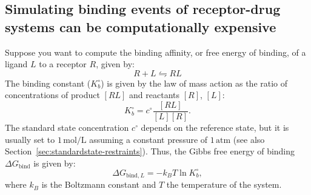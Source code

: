 \documentclass[9pt,bestpractices]{livecoms}
\begin{document}
\subsection{Simulating binding events of receptor-drug systems can be computationally expensive}
Suppose you want to compute the binding affinity, or free energy of binding, of a ligand $L$ to a receptor $R$, given by:
\begin{equation}
R+L \leftrightharpoons RL
\end{equation}
The binding constant ($K_b^{\circ}$) is given by the law of mass action as the ratio of concentrations of product $[RL]$ and reactants $[R]$, $[L]$:
\begin{equation}
 K_b^{\circ} = c^{\circ}\frac{[RL]}{[L][R]}.
\end{equation}
The standard state concentration $c^\circ$ depends on the reference state, but it is usually set to $1\,\mathrm{mol}/\mathrm{L}$ assuming a constant pressure of $1\,\mathrm{atm}$ (see also Section~\ref{sec:standardstate-restraints}).
Thus, the Gibbs free energy of binding $\Delta G_{\mathrm{bind}}$ is given by:
\begin{equation}
    \Delta G_{\mathrm{bind},L} = -k_BT\ln K_b^{\circ},
\end{equation}
where $k_B$ is the Boltzmann constant and $T$ the temperature of the system.
\end{document}

